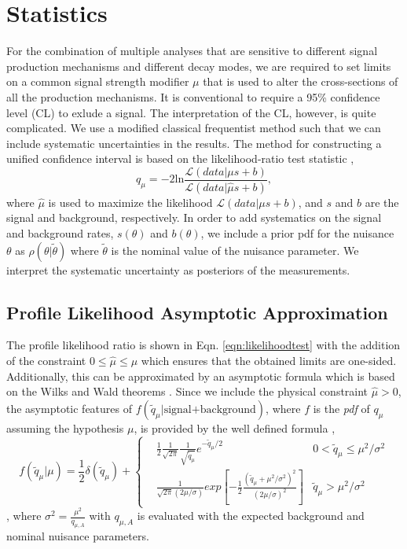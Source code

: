 \section{Statistics}\label{sec:Statistics}

For the combination of multiple analyses that are sensitive to different signal production mechanisms and different decay modes, we are required to set limits on a common signal strength modifier $\mu$ that is used to alter the cross-sections of all the production mechanisms. It is conventional to require a 95\% confidence level (CL) to exlude a signal. The interpretation of the CL, however, is quite complicated. We use a modified classical frequentist method such that we can include systematic uncertainties in the results. The method for constructing a unified confidence interval is based on the likelihood-ratio test statistic \cite{feldman_unified_1998}, 
\begin{equation}\label{eqn:likelihoodtest}
q_\mu=-2\text{ln}\frac{\mathcal{L}(data|\mu s+b)}{\mathcal{L}(data|\hat{\mu} s+b)},
\end{equation}
where $\hat{\mu}$ is used to maximize the likelihood $\mathcal{L}(data|\mu s+b)$, and $s$ and $b$ are the signal and background, respectively. In order to add systematics on the signal and background rates, $s(\theta)$ and $b(\theta)$, we include a prior pdf for the nuisance $\theta$ as $\rho(\theta|\widetilde{\theta})$ where $\widetilde{\theta}$ is the nominal value of the nuisance parameter. We interpret the systematic uncertainty as posteriors of the measurements. 

\subsection{Profile Likelihood Asymptotic Approximation}\label{subsec:Asymptotic}

The profile likelihood ratio is shown in Eqn. \ref{eqn:likelihoodtest} with the addition of the constraint $0\leq\widehat{\mu}\leq\mu$ which ensures that the obtained limits are one-sided. Additionally, this can be approximated by an asymptotic formula which is based on the Wilks and Wald theorems \cite{cowan_asymptotic_2011}. Since we include the physical constraint $\widehat{\mu}>0$, the asymptotic features of $f(\widetilde{q}_\mu|\text{signal+background})$, where $f$ is the \textit{pdf} of $q_\mu$ assuming the hypothesis $\mu$, is provided by the well defined formula \cite{cowan_asymptotic_2011}, 
\begin{equation}\label{eqn:profileLikelihood}
f(\widetilde{q}_\mu|\mu)=\frac{1}{2}\delta(\widetilde{q}_\mu)+\left\{
\begin{split}
&\frac{1}{2}\frac{1}{\sqrt{2\pi}}\frac{1}{\sqrt{\widetilde{q}_\mu}}e^{-\widetilde{q}_\mu/2} & 0<\widetilde{q}_\mu\leq\mu^2/\sigma^2 \\
&\frac{1}{\sqrt{2\pi}(2\mu/\sigma)}exp[-\frac{1}{2}\frac{(\widetilde{q}_\mu+\mu^2/\sigma^2)^2}{(2\mu/\sigma)^2}] & \widetilde{q}_\mu>\mu^2/\sigma^2
\end{split}
\end{equation},
where $\sigma^2=\frac{\mu^2}{q_{\mu,A}}$ with $q_{\mu,A}$ is evaluated with the expected background and nominal nuisance parameters. 

